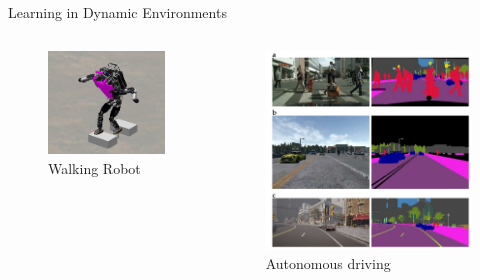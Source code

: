 \documentclass[xcolor=dvipsnames]{beamer}
\begin{document}
\begin{frame}{Learning in Dynamic Environments}
    \begin{columns}
        \begin{column}{0.5\textwidth}
            \begin{figure}
                \centering
                \includegraphics[height=0.8\textwidth]{atlas.jpg}
                \caption{Walking Robot \cite{wiedebach_walking_2016}}
                \label{fig:walking-robot}
            \end{figure}
        \end{column}
        \begin{column}{0.5\textwidth}
            \begin{figure}
                \centering
                \includegraphics[height=0.8\textwidth]{tesla.jpg}
                \caption{Autonomous driving \cite{saha_practical_2023}}
                \label{fig:autonomous-driving}
            \end{figure}
        \end{column}
    \end{columns}
\end{frame}
\end{document}
